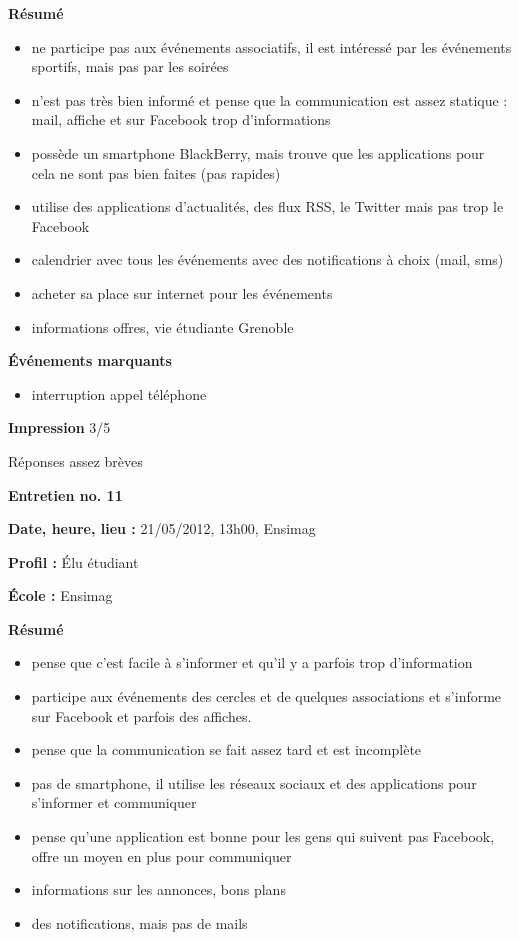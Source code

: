 \documentclass[a4paper, 11px]{article}
\begin{document}
\textbf{Résumé}
	\begin{itemize}
		\item ne participe pas aux événements associatifs, il est intéressé par les événements sportifs, mais pas par les soirées
		\item n'est pas très bien informé et pense que la communication est assez statique : mail, affiche et sur Facebook trop d'informations
		\item possède un smartphone BlackBerry, mais trouve que les applications pour cela ne sont pas bien faites (pas rapides)
		\item utilise des applications d'actualités, des flux RSS, le Twitter mais pas trop le Facebook
		\item calendrier avec tous les événements avec des notifications à choix (mail, sms)
		\item acheter sa place sur internet pour les événements
		\item informations offres, vie étudiante Grenoble
	\end{itemize}

\vspace{.25cm}
\textbf{Événements marquants}
	\begin{itemize}
		\item interruption appel téléphone
	\end{itemize}
\vspace{.25cm}

\textbf{Impression}
3/5

Réponses assez brèves


\vspace{.3cm}

 \textbf {\large Entretien no. 11}

\textbf{Date, heure, lieu : }
21/05/2012, 13h00, Ensimag

\textbf{Profil : }
Élu étudiant

\textbf{École : }
Ensimag

\textbf{Résumé}
	\begin{itemize}

		\item pense que c'est facile à s'informer et qu'il y a parfois trop d'information
		\item participe aux événements des cercles et de quelques associations et s'informe sur Facebook et parfois des affiches.
		\item pense que la communication se fait assez tard et est incomplète
		\item pas de smartphone, il utilise les réseaux sociaux et des applications pour s'informer et communiquer
		\item pense qu'une application est bonne pour les gens qui suivent pas Facebook, offre un moyen en plus pour communiquer
		\item informations sur les annonces, bons plans
		\item des notifications, mais pas de mails
	\end{itemize}
\end{document}
